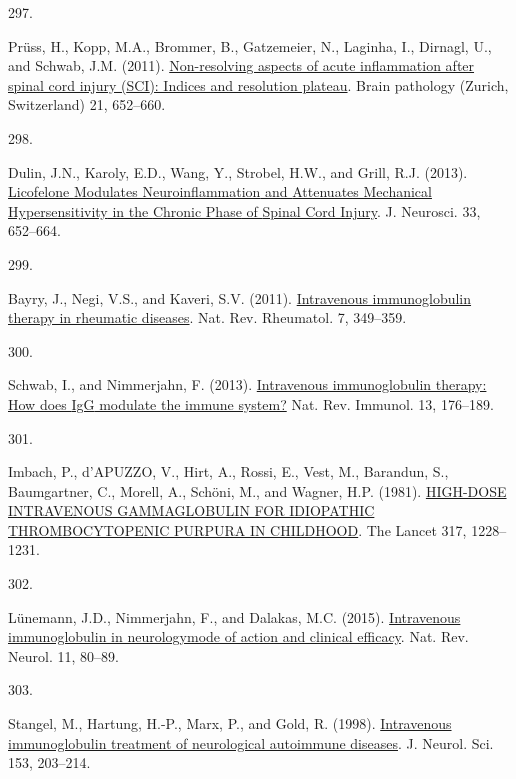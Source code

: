 \documentclass[
]{article}
\newlength{\cslhangindent}
\newlength{\csllabelwidth}
\newlength{\cslentryspacingunit} %
\newenvironment{CSLReferences}[2] %
 {%
  \setlength{\parindent}{0pt}
  \ifodd #1
  \let\oldpar\par
  \def\par{\hangindent=\cslhangindent\oldpar}
  \fi
  \setlength{\parskip}{#2\cslentryspacingunit}
 }%
 {}
\newcommand{\CSLLeftMargin}[1]{\parbox[t]{\csllabelwidth}{#1}}
\newcommand{\CSLRightInline}[1]{\parbox[t]{\linewidth - \csllabelwidth}{#1}\break}
\begin{document}
\begin{CSLReferences}{0}{0}
\leavevmode{}%
\CSLLeftMargin{297. }
\CSLRightInline{Prüss, H., Kopp, M.A., Brommer, B., Gatzemeier, N., Laginha, I., Dirnagl, U., and Schwab, J.M. (2011). \href{https://doi.org/10.1111/j.1750-3639.2011.00488.x}{Non-resolving aspects of acute inflammation after spinal cord injury ({SCI}): Indices and resolution plateau}. Brain pathology (Zurich, Switzerland) 21, 652--660.}

\leavevmode{}%
\CSLLeftMargin{298. }
\CSLRightInline{Dulin, J.N., Karoly, E.D., Wang, Y., Strobel, H.W., and Grill, R.J. (2013). \href{https://doi.org/10.1523/JNEUROSCI.6128-11.2013}{Licofelone {Modulates Neuroinflammation} and {Attenuates Mechanical Hypersensitivity} in the {Chronic Phase} of {Spinal Cord Injury}}. J. Neurosci. 33, 652--664.}

\leavevmode{}%
\CSLLeftMargin{299. }
\CSLRightInline{Bayry, J., Negi, V.S., and Kaveri, S.V. (2011). \href{https://doi.org/10.1038/nrrheum.2011.61}{Intravenous immunoglobulin therapy in rheumatic diseases}. Nat. Rev. Rheumatol. 7, 349--359.}

\leavevmode{}%
\CSLLeftMargin{300. }
\CSLRightInline{Schwab, I., and Nimmerjahn, F. (2013). \href{https://doi.org/10.1038/nri3401}{Intravenous immunoglobulin therapy: How does {IgG} modulate the immune system?} Nat. Rev. Immunol. 13, 176--189.}

\leavevmode{}%
\CSLLeftMargin{301. }
\CSLRightInline{Imbach, P., d'APUZZO, V., Hirt, A., Rossi, E., Vest, M., Barandun, S., Baumgartner, C., Morell, A., Schöni, M., and Wagner, H.P. (1981). \href{https://doi.org/10.1016/S0140-6736(81)92400-4}{{HIGH-DOSE INTRAVENOUS GAMMAGLOBULIN FOR IDIOPATHIC THROMBOCYTOPENIC PURPURA IN CHILDHOOD}}. The Lancet 317, 1228--1231.}

\leavevmode{}%
\CSLLeftMargin{302. }
\CSLRightInline{Lünemann, J.D., Nimmerjahn, F., and Dalakas, M.C. (2015). \href{https://doi.org/10.1038/nrneurol.2014.253}{Intravenous immunoglobulin in neurology\textemdash mode of action and clinical efficacy}. Nat. Rev. Neurol. 11, 80--89.}

\leavevmode{}%
\CSLLeftMargin{303. }
\CSLRightInline{Stangel, M., Hartung, H.-P., Marx, P., and Gold, R. (1998). \href{https://doi.org/10.1016/S0022-510X(97)00292-X}{Intravenous immunoglobulin treatment of neurological autoimmune diseases}. J. Neurol. Sci. 153, 203--214.}


\end{CSLReferences}
\end{document}
